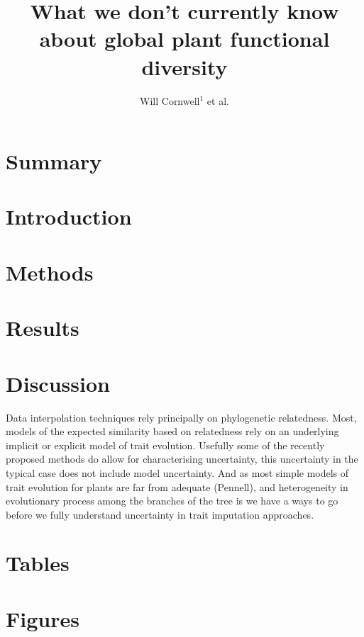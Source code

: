 \documentclass[a4paper,11pt]{article}
\title{What we don't currently know about global plant functional diversity}
\author{
Will Cornwell$^1$
et al.}
\affiliation{
*final list and order undecided\\
$^1$ University of NSW\\
}
\date{}
\begin{document}
\mstitlepage
\noindent

\section{Summary}


\section{Introduction}

\section{Methods}

\section{Results}


\section{Discussion}

Data interpolation techniques rely principally on phylogenetic relatedness.  
Most, models of the expected similarity based on relatedness rely on an underlying implicit or explicit model of trait evolution.  
Usefully some of the recently proposed methods do allow for characterising uncertainty, this uncertainty in the typical case
does not include model uncertainty.  And as most simple models of trait evolution for plants are far from adequate (Pennell), and heterogeneity in evolutionary 
process among the branches of the tree is 
we have a ways to go before we fully understand uncertainty in trait imputation approaches.   

\section{Tables}







\section{Figures}
\end{document}
